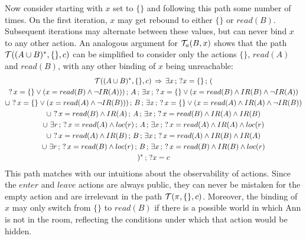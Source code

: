Now consider starting with $x$ set to $\{\}$ and following this
path some number of times. On the first iteration, $x$ may get rebound
to either $\{\}$ or $read(B)$. Subsequent iterations may alternate
between these values, but can never bind $x$ to any other action.
An analogous argument for $\mathcal{T}_{a}(B,x)$ shows that the path $\mathcal{T}((A\cup B)^{*},\{\},c)$
can be simplified to consider only the actions $\{\}$, $read(A)$
and $read(B)$, with any other binding of $x$ being unreachable:\begin{multline*}
\mathcal{T}((A\cup B)^{*},\{\},c)\,\Rightarrow\,\exists x\,;\,?x=\{\}\,;\,(\\
?\, x=\{\}\vee(x=read(B)\wedge\neg IR(A)))\,;\, A\,;\,\exists x\,;\,?\, x=\{\}\vee(x=read(B)\wedge IR(B)\wedge\neg IR(A))\\
\cup\,\,?\, x=\{\}\vee(x=read(A)\wedge\neg IR(B)))\,;\, B\,;\,\exists x\,;\,?\, x=\{\}\vee(x=read(A)\wedge IR(A)\wedge\neg IR(B))\\
\cup\,\,?\, x=read(B)\wedge IR(A)\,;\, A\,;\,\exists x\,;\,?\, x=read(B)\wedge IR(A)\wedge IR(B)\\
\cup\,\,\exists r\,;\,?\, x=read(A)\wedge loc(r)\,;\, A\,;\,\exists x\,;\,?\, x=read(A)\wedge IR(A)\wedge loc(r)\\
\cup\,\,?\, x=read(A)\wedge IR(B)\,;\, B\,;\,\exists x\,;\,?\, x=read(A)\wedge IR(B)\wedge IR(A)\\
\cup\,\,\exists r\,;\,?\, x=read(B)\wedge loc(r)\,;\, B\,;\,\exists x\,;\,?\, x=read(B)\wedge IR(B)\wedge loc(r)\\
)^{*}\,;\,?x=c\end{multline*}
This path matches with our intuitions about the observability of actions.
Since the $enter$ and $leave$ actions are always public, they can
never be mistaken for the empty action and are irrelevant in the path
$\mathcal{T}(\pi,\{\},c)$. Moreover, the binding of $x$ may only switch
from $\{\}$ to $read(B)$ if there is a possible world in which Ann
is not in the room, reflecting the conditions under which that action
would be hidden.

